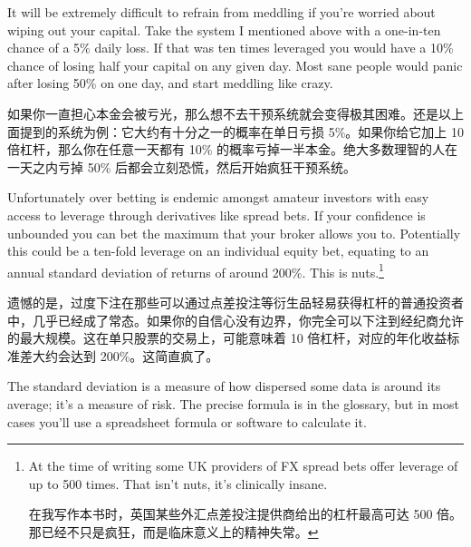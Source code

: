 
\begin{englishblock} It will be extremely difficult to refrain from meddling if you're worried about wiping out your capital. Take the system I mentioned above with a one-in-ten chance of a 5\% daily loss. If that was ten times leveraged you would have a 10\% chance of losing half your capital on any given day. Most sane people would panic after losing 50\% on one day, and start meddling like crazy. \end{englishblock}

\begin{chineseblock}如果你一直担心本金会被亏光，那么想不去干预系统就会变得极其困难。还是以上面提到的系统为例：它大约有十分之一的概率在单日亏损 5\%。如果你给它加上 10 倍杠杆，那么你在任意一天都有 10\% 的概率亏掉一半本金。绝大多数理智的人在一天之内亏掉 50\% 后都会立刻恐慌，然后开始疯狂干预系统。\end{chineseblock}

\bipairgap

\begin{englishblock} Unfortunately over betting is endemic amongst amateur investors with easy access to leverage through derivatives like spread bets. If your confidence is unbounded you can bet the maximum that your broker allows you to. Potentially this could be a ten-fold leverage on an individual equity bet, equating to an annual standard deviation of returns of around 200\%. This is nuts.\footnote{At the time of writing some UK providers of FX spread bets offer leverage of up to 500 times. That isn't nuts, it's clinically insane. \par 在我写作本书时，英国某些外汇点差投注提供商给出的杠杆最高可达 500 倍。那已经不只是疯狂，而是临床意义上的精神失常。}\end{englishblock}

\begin{chineseblock}遗憾的是，过度下注在那些可以通过点差投注等衍生品轻易获得杠杆的普通投资者中，几乎已经成了常态。如果你的自信心没有边界，你完全可以下注到经纪商允许的最大规模。这在单只股票的交易上，可能意味着 10 倍杠杆，对应的年化收益标准差大约会达到 200\%。这简直疯了。\end{chineseblock}


\begin{englishblock} The standard deviation is a measure of how dispersed some data is around its average; it's a measure of risk. The precise formula is in the glossary, but in most cases you'll use a spreadsheet formula or software to calculate it. \end{englishblock}

